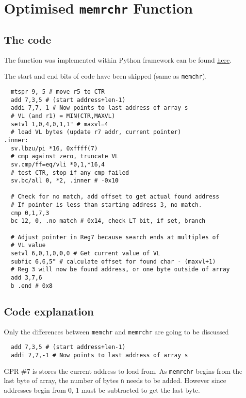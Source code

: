 %

\section{Optimised \texttt{memrchr} Function}

\subsection{The code}

The function was implemented within Python framework can be found
\href{https://github.com/ngisearchsvp64/glibc-svp64/blob/master/svp64-port/experimentation/test_memrchr.py}{here}.

The start and end bits of code have been skipped (same as \texttt{memchr}).
\begin{verbatim}
  mtspr 9, 5 # move r5 to CTR
  add 7,3,5 # (start address+len-1)
  addi 7,7,-1 # Now points to last address of array s
  # VL (and r1) = MIN(CTR,MAXVL)
  setvl 1,0,4,0,1,1" # maxvl=4
  # load VL bytes (update r7 addr, current pointer)
.inner:
  sv.lbzu/pi *16, 0xffff(7)
  # cmp against zero, truncate VL
  sv.cmp/ff=eq/vli *0,1,*16,4
  # test CTR, stop if any cmp failed
  sv.bc/all 0, *2, .inner # -0x10

  # Check for no match, add offset to get actual found address
  # If pointer is less than starting address 3, no match.
  cmp 0,1,7,3
  bc 12, 0, .no_match # 0x14, check LT bit, if set, branch

  # Adjust pointer in Reg7 because search ends at multiples of
  # VL value
  setvl 6,0,1,0,0,0 # Get current value of VL
  subfic 6,6,5" # calculate offset for found char - (maxvl+1)
  # Reg 3 will now be found address, or one byte outside of array
  add 3,7,6
  b .end # 0x8
\end{verbatim}

\subsection{Code explanation}
Only the differences between \texttt{memchr} and \texttt{memrchr} are going to
be discussed

\begin{verbatim}
  add 7,3,5 # (start address+len-1)
  addi 7,7,-1 # Now points to last address of array s
\end{verbatim}
\acrshort{GPR} \#7 is stores the current address to load from. As \texttt{memrchr}
begins from the last byte of array, the number of bytes \texttt{n} needs to be
added. However since addresses begin from 0, 1 must be subtracted to get the
last byte.

